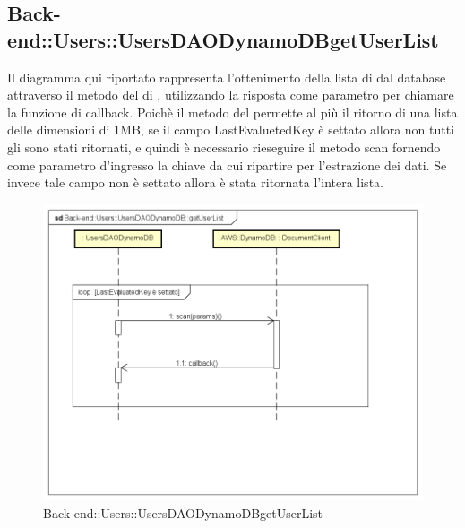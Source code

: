 \subsection{Back-end::Users::UsersDAODynamoDBgetUserList}
Il diagramma qui riportato rappresenta l'ottenimento della lista di  dal database attraverso il metodo  del  di , utilizzando la risposta come parametro per chiamare la funzione di callback. Poichè il metodo  del  permette al più il ritorno di una lista delle dimensioni di 1MB, se il campo LastEvaluetedKey è settato allora non tutti gli  sono stati ritornati, e quindi è necessario rieseguire il metodo scan fornendo come parametro d'ingresso la chiave da cui ripartire per l'estrazione dei dati. Se invece tale campo non è settato allora è stata ritornata l'intera lista.
\begin{figure}[h] \centering \includegraphics[width=\textwidth,height=\textheight,keepaspectratio]{images/diagrams/back-end/Ufficial_Backend/Back-endUsersUsersDAODynamoDBgetUserList.png} 	\caption{Back-end::Users::UsersDAODynamoDBgetUserList}
\end{figure}
\newpage

